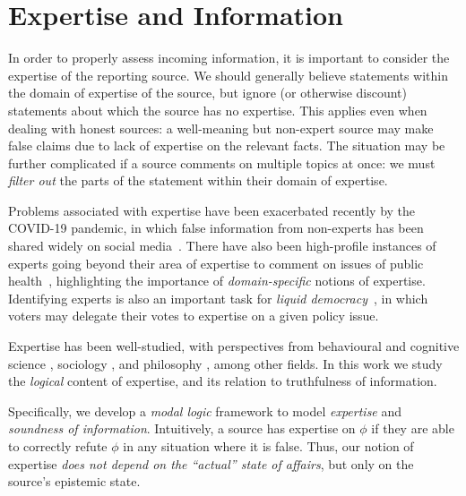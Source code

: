 \chapter{Expertise and Information}
\label{chapter_expertise}


In order to properly assess incoming information, it is important to consider
the expertise of the reporting source. We should generally believe statements
within the domain of expertise of the source, but ignore (or otherwise
discount) statements about which the source has no expertise. This applies even
when dealing with honest sources: a well-meaning but non-expert source may make
false claims due to lack of expertise on the relevant facts.
%
The situation may be further complicated if a source comments on multiple
topics at once: we must \emph{filter out} the parts of the statement within
their domain of expertise.

Problems associated with expertise have been exacerbated recently by the
COVID-19 pandemic, in which false information from non-experts has been shared
widely on social media~\cite{Llewellynm1160,dijck2020}. There have also been
high-profile instances of experts going beyond their area of expertise to
comment on issues of public health~\cite{xaudiera2020ibuprofen}, highlighting
the importance of \emph{domain-specific} notions of expertise. Identifying
experts is also an important task for \emph{liquid
democracy}~\cite{blum2016liquid}, in which voters may delegate their votes to
expertise on a given policy issue.

Expertise has been well-studied, with perspectives from behavioural and
cognitive science \cite{chi2014nature,ericsson2010expertise}, sociology
\cite{collins2008rethinking}, and philosophy
\cite{kilov2021brittleness,whyte2010trust,goldman2018expertise}, among other
fields. In this work we study the \emph{logical} content of expertise, and its
relation to truthfulness of information.

Specifically, we develop a \emph{modal logic} framework to model
\emph{expertise} and \emph{soundness of information}. Intuitively, a source has
expertise on $\phi$ if they are able to correctly refute $\phi$ in any
situation where it is false.\footnotemark{} Thus, our notion of expertise
\emph{does not depend on the ``actual'' state of affairs}, but only on the
source's epistemic state.

